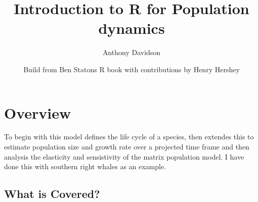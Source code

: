 \documentclass[]{book}
\title{Introduction to R for Population dynamics}
\author{Anthony Davidson}
\date{Build from Ben Statons R book with contributions by Henry Hershey}
\let\oldmaketitle\maketitle
\begin{document}
\maketitle

%



\thispagestyle{empty}
\let\maketitle\oldmaketitle
\maketitle
\thispagestyle{empty}

{
\hypersetup{linkcolor=black}
\setcounter{tocdepth}{1}
\tableofcontents
}
\hypertarget{overview}{%
\chapter*{Overview}\label{overview}}

To begin with this model defines the life cycle of a species, then extendes this to estimate population size and growth rate over a projected time frame and then analysis the elasticity and sensistivity of the matrix population model. I have done this with southern right whales as an example.

\hypertarget{what-is-covered}{%
\section*{What is Covered?}\label{what-is-covered}}
\end{document}
